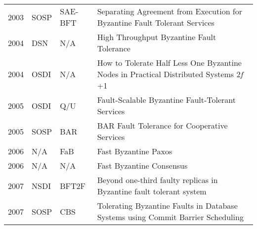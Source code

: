 \documentclass{article}
\begin{document}
\begin{landscape}
\begin{longtable}[c]{llll}
2003 & SOSP              & SAE-BFT        & Separating Agreement from Execution for Byzantine Fault Tolerant Services    \cite{Yin:2003:SAE:945445.945470}              \\
2004 & DSN              & N/A          &   
High Throughput Byzantine Fault Tolerance                                  \\
2004 & OSDI              & N/A          & How to Tolerate Half Less One Byzantine Nodes in Practical Distributed Systems     2\textit{f} +1  \cite{Correia:2004:THL:1032662.1034362}                                     \\
2005 & OSDI              & Q/U            & Fault-Scalable Byzantine Fault-Tolerant Services     \cite{Abd-El-Malek:2005:FBF:1095810.1095817}                                       \\
2005 & SOSP              & BAR            & BAR Fault Tolerance for Cooperative Services      \cite{Aiyer:2005:BFT:1095810.1095816}                                         \\
2006 & N/A               & FaB            & Fast Byzantine Paxos                                                                      \\
2006 & N/A               & N/A            & Fast Byzantine Consensus                                                                  \\
2007 & NSDI              & BFT2F          & Beyond one-third faulty replicas in Byzantine fault tolerant system                       \\
2007 & SOSP              & CBS            & Tolerating Byzantine Faults in Database Systems using Commit Barrier Scheduling    \cite{Vandiver:2007:TBF:1294261.1294268}       \\


\end{longtable}
\end{landscape}
\end{document}

